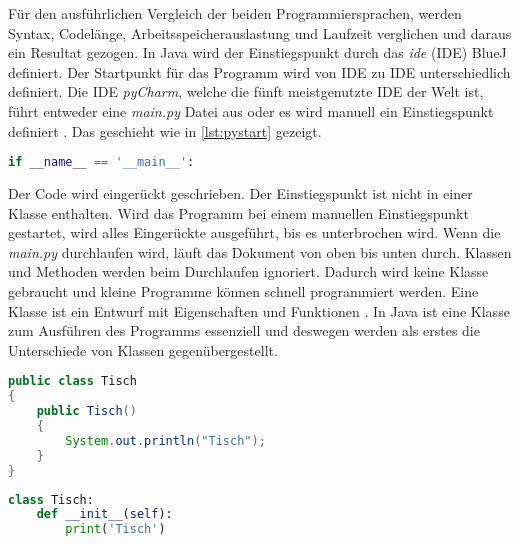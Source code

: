 Für den ausführlichen Vergleich der beiden Programmiersprachen, werden Syntax, Codelänge, Arbeitsspeicherauslastung und Laufzeit verglichen und daraus ein Resultat gezogen.
In Java wird der Einstiegspunkt durch das \textit{\acrlong{ide}} (IDE) BlueJ definiert. Der Startpunkt für das Programm wird von IDE zu IDE unterschiedlich definiert. Die IDE \textit{pyCharm}, welche die fünft meistgenutzte IDE der Welt ist, führt entweder eine \textit{main.py} Datei aus oder es wird manuell ein Einstiegspunkt definiert \cite{Github:IDE}. Das geschieht wie in \ref{lst:pystart} gezeigt.

\begin{lstlisting}[language=python,caption={Einstiegspunkt Python},captionpos=b,label={lst:pystart}]
if __name__ == '__main__':
\end{lstlisting}

Der Code wird eingerückt geschrieben. Der Einstiegspunkt ist nicht in einer Klasse enthalten. Wird das Programm bei einem manuellen Einstiegspunkt gestartet, wird alles Eingerückte ausgeführt, bis es unterbrochen wird. Wenn die \textit{main.py} durchlaufen wird, läuft das Dokument von oben bis unten durch. Klassen und Methoden werden beim Durchlaufen ignoriert. Dadurch wird keine Klasse gebraucht und kleine Programme können schnell programmiert werden. Eine Klasse ist ein Entwurf mit Eigenschaften und Funktionen \cite{gfg}. In Java ist eine Klasse zum Ausführen des Programms essenziell und deswegen werden als erstes die Unterschiede von Klassen gegenübergestellt.

\begin{lstlisting}[language=java,caption={Klasse in Java},captionpos=b,label={lst:java:class}]
public class Tisch
{
    public Tisch()
    {
        System.out.println("Tisch");
    }
}
\end{lstlisting}

\begin{lstlisting}[language=python,caption={Klasse in Python},captionpos=b,label={lst:python:class}]
class Tisch:
    def __init__(self):
        print('Tisch')
\end{lstlisting}

